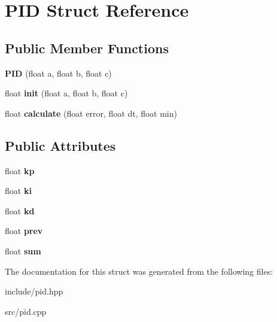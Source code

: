 \hypertarget{structPID}{}\section{P\+ID Struct Reference}
\label{structPID}
\subsection*{Public Member Functions}
\begin{DoxyCompactItemize}
\item 
\mbox{\label{structPID_ac5b3e2a5ad35e07517f40b8164821f8e}} 
{\bfseries P\+ID} (float a, float b, float c)
\item 
\mbox{\label{structPID_a43370ace90e60c06253f9322101e3517}} 
float {\bfseries init} (float a, float b, float c)
\item 
\mbox{\label{structPID_a7d7903c58db1a8b6c63a6f40672d3765}} 
float {\bfseries calculate} (float error, float dt, float min)
\end{DoxyCompactItemize}
\subsection*{Public Attributes}
\begin{DoxyCompactItemize}
\item 
\mbox{\label{structPID_a9bff6d497fdd262f6f0f74a76604d22a}} 
float {\bfseries kp}
\item 
\mbox{\label{structPID_af2b185d6025a735e294c3ca698562648}} 
float {\bfseries ki}
\item 
\mbox{\label{structPID_ac8f8dd4ddd347ff859db4e1dc3af90d5}} 
float {\bfseries kd}
\item 
\mbox{\label{structPID_ab1935e94bf22e1c6f8565a0677ab0871}} 
float {\bfseries prev}
\item 
\mbox{\label{structPID_a04f280906a9f186e64100b3a58775a71}} 
float {\bfseries sum}
\end{DoxyCompactItemize}


The documentation for this struct was generated from the following files\+:\begin{DoxyCompactItemize}
\item 
include/pid.\+hpp\item 
src/pid.\+cpp\end{DoxyCompactItemize}
